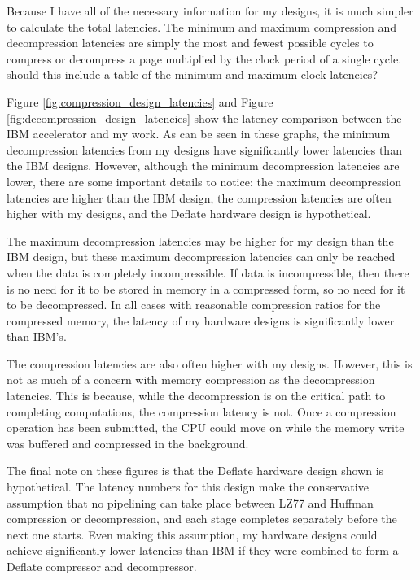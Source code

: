 \documentclass[doublespace,nopageskip]{VTthesis}
\begin{document}
Because I have all of the necessary information for my designs, it is much simpler to calculate the total latencies. The minimum and maximum compression and decompression latencies are simply the most and fewest possible cycles to compress or decompress a page multiplied by the clock period of a single cycle. {\color{red} should this include a table of the minimum and maximum clock latencies?}

Figure \ref{fig:compression_design_latencies} and Figure \ref{fig:decompression_design_latencies} show the latency comparison between the IBM accelerator and my work. As can be seen in these graphs, the minimum decompression latencies from my designs have significantly lower latencies than the IBM designs. However, although the minimum decompression latencies are lower, there are some important details to notice: the maximum decompression latencies are higher than the IBM design, the compression latencies are often higher with my designs, and the Deflate hardware design is hypothetical.

The maximum decompression latencies may be higher for my design than the IBM design, but these maximum decompression latencies can only be reached when the data is completely incompressible. If data is incompressible, then there is no need for it to be stored in memory in a compressed form, so no need for it to be decompressed. In all cases with reasonable compression ratios for the compressed memory, the latency of my hardware designs is significantly lower than IBM's.

The compression latencies are also often higher with my designs. However, this is not as much of a concern with memory compression as the decompression latencies. This is because, while the decompression is on the critical path to completing computations, the compression latency is not. Once a compression operation has been submitted, the CPU could move on while the memory write was buffered and compressed in the background.

The final note on these figures is that the Deflate hardware design shown is hypothetical. The latency numbers for this design make the conservative assumption that no pipelining can take place between LZ77 and Huffman compression or decompression, and each stage completes separately before the next one starts. Even making this assumption, my hardware designs could achieve significantly lower latencies than IBM if they were combined to form a Deflate compressor and decompressor.
\end{document}
